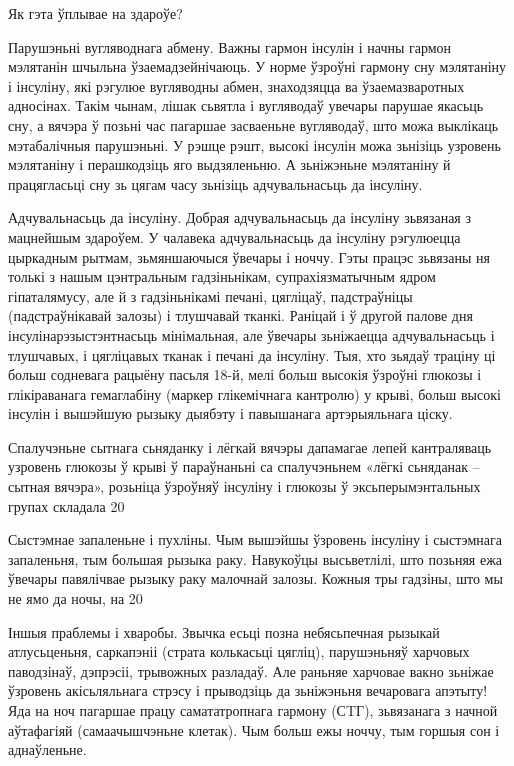 Як гэта ўплывае на здароўе?

Парушэньні вугляводнага абмену.
Важны гармон інсулін і начны гармон мэлятанін шчыльна ўзаемадзейнічаюць. У норме ўзроўні гармону сну мэлятаніну і інсуліну, які рэгулюе вугляводны абмен, знаходзяцца ва ўзаемазваротных адносінах. Такім чынам, лішак сьвятла і вугляводаў увечары парушае якасьць сну, а вячэра ў позьні час пагаршае засваеньне вугляводаў, што можа выклікаць мэтабалічныя парушэньні. У рэшце рэшт, высокі інсулін можа зьнізіць узровень мэлятаніну і перашкодзіць яго выдзяленьню. А зьніжэньне мэлятаніну й працягласьці сну зь цягам часу зьнізіць адчувальнасьць да інсуліну.

Адчувальнасьць да інсуліну.
Добрая адчувальнасьць да інсуліну зьвязаная з мацнейшым здароўем. У чалавека адчувальнасьць да інсуліну рэгулюецца цыркадным рытмам, зьмяншаючыся ўвечары і ноччу. Гэты працэс зьвязаны ня толькі з нашым цэнтральным гадзіньнікам, супрахіязматычным ядром гіпаталямусу, але й з гадзіньнікамі печані, цягліцаў, падстраўніцы (падстраўнікавай залозы) і тлушчавай тканкі. Раніцай і ў другой палове дня інсулінарэзыстэнтнасьць мінімальная, але ўвечары зьніжаецца адчувальнасьць і тлушчавых, і цягліцавых тканак і печані да інсуліну. Тыя, хто зьядаў траціну ці больш содневага рацыёну пасьля 18-й, мелі больш высокія ўзроўні глюкозы і глікіраванага гемаглабіну (маркер глікемічнага кантролю) у крыві, больш высокі інсулін і вышэйшую рызыку дыябэту і павышанага артэрыяльнага ціску.

Спалучэньне сытнага сьняданку і лёгкай вячэры дапамагае лепей кантраляваць узровень глюкозы ў крыві ў параўнаньні са спалучэньнем «лёгкі сьняданак – сытная вячэра», розьніца ўзроўняў інсуліну і глюкозы ў эксьперымэнтальных групах складала 20%

Сыстэмнае запаленьне і пухліны.
Чым вышэйшы ўзровень інсуліну і сыстэмнага запаленьня, тым большая рызыка раку. Навукоўцы высьветлілі, што позьняя ежа ўвечары павялічвае рызыку раку малочнай залозы. Кожныя тры гадзіны, што мы не ямо да ночы, на 20%

Іншыя праблемы і хваробы.
Звычка есьці позна небясьпечная рызыкай атлусьценьня, саркапэніі (страта колькасьці цягліц), парушэньняў харчовых паводзінаў, дэпрэсіі, трывожных разладаў. Але раньняе харчовае вакно зьніжае ўзровень акісьляльнага стрэсу і прыводзіць да зьніжэньня вечаровага апэтыту! Яда на ноч пагаршае працу самататропнага гармону (СTГ), зьвязанага з начной аўтафагіяй (самаачышчэньне клетак). Чым больш ежы ноччу, тым горшыя сон і аднаўленьне.

